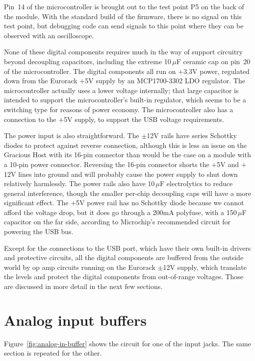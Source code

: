 Pin~14 of the microcontroller is brought out to the test point P5 on the
back of the module.  With the standard build of the firmware, there is no
signal on this test point, but debugging code can send signals to this point
where they can be observed with an oscilloscope.

None of these digital components requires much in the way of support
circuitry beyond decoupling capacitors, including the extreme 10\,$\mu$F
ceramic cap on pin~20 of the microcontroller.  The digital components all
run on $+$3.3V power, regulated down from the Eurorack $+$5V supply by an
MCP1700-3302 LDO regulator.  The microcontroller actually uses a lower
voltage internally; that large capacitor is intended to support the
microcontroller's built-in regulator, which seems to be a switching type for
reasons of power economy.  The microcontroller also has a connection to the
$+$5V supply, to support the USB voltage requirements.

The power input is also straightforward.  The $\pm$12V rails have series
Schottky diodes to protect against reverse connection, although this is less
an issue on the Gracious Host with its 16-pin connector than would be the
case on a module with a 10-pin power connector.  Reversing the 16-pin
connector shorts the $+$5V and $+$12V lines into ground and will probably
cause the power supply to shut down relatively harmlessly.  The power rails
also have 10\,$\mu$F electrolytics to reduce general interference, though the
smaller per-chip decoupling caps will have a more significant effect.  The
$+$5V power rail has no Schottky diode because we cannot afford the voltage
drop, but it does go through a 200mA polyfuse, with a 150\,$\mu$F capacitor on
the far side, according to Microchip's recommended circuit for powering the
USB bus.

Except for the connections to the USB port, which have their own built-in
drivers and protective circuits, all the digital components are buffered from
the outside world by op amp circuits running on the Eurorack $\pm$12V
supply, which translate the levels and protect the digital components from
out-of-range voltages.  Those are discussed in more detail in the next few
sections.

\section{Analog input buffers}

Figure~\ref{fig:analog-in-buffer} shows the circuit for one of the input
jacks.  The same section is repeated for the other.

